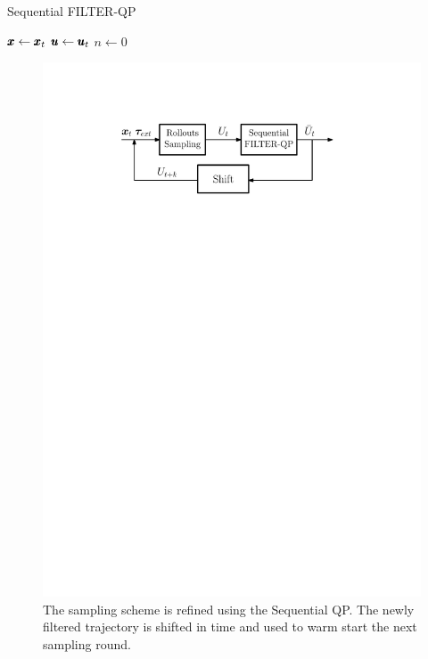 \begin{algorithm}
\caption{Sequential FILTER-QP \label{algo:sequential_qp}}
$\pmb{x} \gets \pmb{x}_t$\;
$\pmb{u} \gets \pmb{u}_t$\;
$n \gets 0$\;
\end{algorithm}

\begin{figure}[h!]
\centering
\includegraphics[width=0.8\columnwidth]{figures/schemes/stochastic_controller.pdf}
\caption{The sampling scheme is refined using the Sequential QP. The newly filtered trajectory is shifted in time and used to warm start the next sampling round.} \label{fig:sampling_scheme}
\end{figure}
